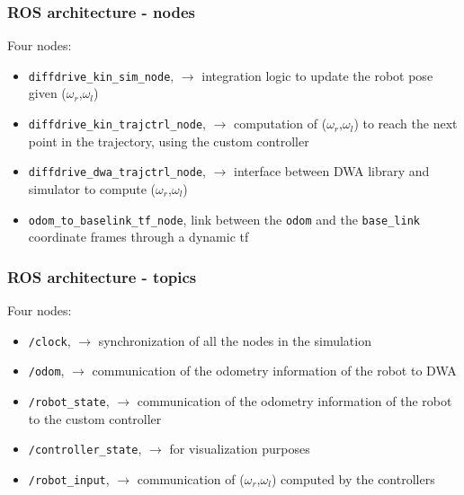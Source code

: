 \documentclass{beamer}
\begin{document}

\begin{frame}
\frametitle{ROS architecture - nodes}

Four nodes:
\begin{itemize}
  \item \texttt{diffdrive\_kin\_sim\_node}, $\rightarrow$ integration logic to update the robot pose given ($\omega_r$,$\omega_l$)
  \item \texttt{diffdrive\_kin\_trajctrl\_node}, $\rightarrow$ computation of ($\omega_r$,$\omega_l$) to reach the next point in the trajectory, using the custom controller
  \item \texttt{diffdrive\_dwa\_trajctrl\_node}, $\rightarrow$ interface between DWA library and simulator to compute ($\omega_r$,$\omega_l$)
  \item \texttt{odom\_to\_baselink\_tf\_node}, link between the \texttt{odom} and the \texttt{base\_link} coordinate frames through a dynamic tf
\end{itemize}

\end{frame}


\begin{frame}
\frametitle{ROS architecture - topics}

Four nodes:
\begin{itemize}
  \item \texttt{/clock}, $\rightarrow$ synchronization of all the nodes in the simulation
  \item \texttt{/odom}, $\rightarrow$ communication of the odometry information of the robot to DWA
  \item \texttt{/robot\_state}, $\rightarrow$ communication of the odometry information of the robot to the custom controller
  \item \texttt{/controller\_state}, $\rightarrow$ for visualization purposes
  \item \texttt{/robot\_input}, $\rightarrow$ communication of ($\omega_r$,$\omega_l$) computed by the controllers
\end{itemize}

\end{frame}

\end{document}
